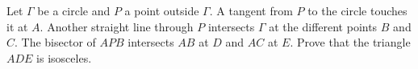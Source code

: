 Let $\Gamma$ be a circle and $P$ a point outside $\Gamma$.
A tangent from $P$ to the circle touches it at $A$. Another straight line through $P$
intersects $\Gamma$ at the different points $B$ and $C$. The bisector of $APB$ intersects
$AB$ at $D$ and $AC$ at $E$. Prove that the triangle $ADE$ is isosceles.